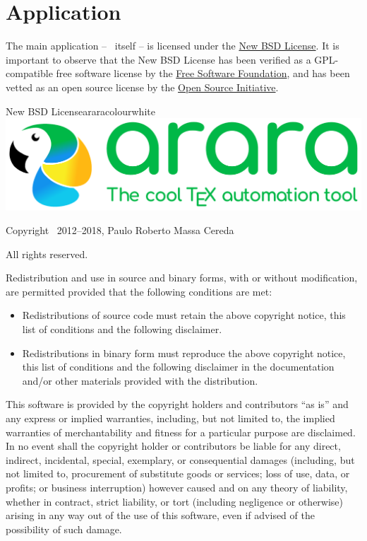 \documentclass[a4paper,twoside,12pt]{memoir}
\begin{document}
\section*{Application}

The main application -- \arara\ itself -- is licensed under the \href{http://www.opensource.org/licenses/bsd-license.php}{New BSD License}. It is important to observe that the New BSD License has been verified as a GPL-compatible free software license by the \href{http://www.fsf.org/}{Free Software Foundation}, and has been vetted as an open source license by the \href{http://www.opensource.org/}{Open Source Initiative}.

\vspace{1em}

\begin{messagebox}{New BSD License}{araracolour}{\icinfo}{white}
\includegraphics[scale=0.25]{../logos/logo1.pdf}

\vspace{1em}

Copyright \textcopyright\ 2012--2018, Paulo Roberto Massa Cereda

All rights reserved.

\vspace{1em}

Redistribution and use in source and binary forms, with or without modification, are permitted provided that the following conditions are met:

\begin{itemize}
\item Redistributions of source code must retain the above copyright notice, this list of conditions and the following disclaimer.
\item Redistributions in binary form must reproduce the above copyright notice, this list of conditions and the following disclaimer in the documentation and/or other materials provided with the distribution.
\end{itemize}

This software is provided by the copyright holders and contributors ``as is'' and any express or implied warranties, including, but not limited to, the implied warranties of merchantability and fitness for a particular purpose are disclaimed. In no event shall the copyright holder or contributors be liable for any direct, indirect, incidental, special, exemplary, or consequential damages (including, but not limited to, procurement of substitute goods or services; loss of use, data, or profits; or business interruption) however caused and on any theory of liability, whether in contract, strict liability, or tort (including negligence or otherwise) arising in any way out of the use of this software, even if advised of the possibility of such damage.
\end{messagebox}
\end{document}
